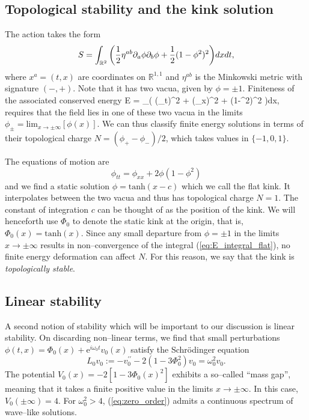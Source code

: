 \subsection{Topological stability and the kink solution}
The action takes the form
\[
S=\int_{\mathbb{R}^2}\bigg( \frac{1}{2}\eta^{ab}\partial_a\phi\partial_b\phi + \frac{1}{2}(1-\phi^2)^2\bigg)dxdt,
\]
where $x^a=(t,x)$ are coordinates on $\mathbb{R}^{1,1}$ and $\eta^{ab}$ is the Minkowski metric with signature $(-,+)$. Note that it has two vacua, given by $\phi=\pm 1$. Finiteness of the associated conserved energy
\be \label{eq:E_integral_flat}
E = \int_\R \bigg( (\phi_t)^2 + (\phi_x)^2 + (1-\phi^2)^2 \bigg)dx,
\ee
requires that the field lies in one of these two vacua in the limits $\phi_\pm=\mathrm{lim}_{x\rightarrow \pm \infty}[\phi(x)]$. We can thus classify finite energy solutions in terms of their topological charge $N = (\phi_+-\phi_-)/2$, which takes values in $\{-1,0,1\}$.




The equations of motion are
\begin{equation}
\label{eom:R11}
\phi_{tt}=\phi_{xx} + 2\phi(1-\phi^2)
\end{equation}
and we find a static solution $\phi=\mathrm{tanh}(x-c)$ which we call the flat kink. It interpolates between the two vacua and thus has topological charge $N=1$. The constant of integration $c$ can be thought of as the position of the kink. We will henceforth use $\Phi_0$ to denote the static kink at the origin, that is, $\Phi_0(x)=\mathrm{tanh}(x)$. Since any small departure from $\phi=\pm 1$ in the limits $x\rightarrow\pm\infty$ results in non--convergence of the integral (\ref{eq:E_integral_flat}), no finite energy deformation can affect $N$. For this reason, we say that the kink is \textit{topologically stable}. 

\subsection{Linear stability}

A second notion of stability which will be important to our discussion is linear stability. On discarding non--linear terms, we find that small perturbations $\phi(t,x)=\Phi_0(x)+\mathrm{e}^{i\omega_0 t}v_0(x)$ satisfy the Schr\"odinger equation
\begin{equation}
\label{eq:zero_order}
L_0v_0:=-v_0^{\prime\prime} - 2(1-3\Phi_0^2)v_0 = \omega^2_0v_0.
\end{equation}
The potential $V_0(x)=-2[1-3\Phi_0(x)^2]$ exhibits a so--called ``mass gap'', meaning that it takes a finite positive value in the limits $x\rightarrow\pm\infty$. In this case, $V_0(\pm\infty)=4$. For $\omega_0^2>4$, (\ref{eq:zero_order}) admits a continuous spectrum of wave--like solutions.

